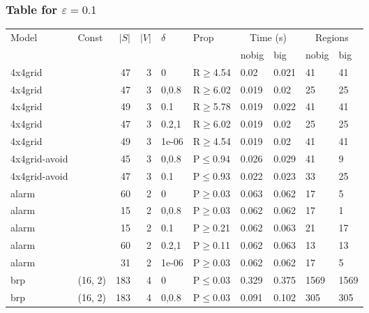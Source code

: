 \subsubsection{Table for \(\varepsilon=0.1\)}
\begin{longtable}{llrrllllll}

        \toprule
        Model & Const & $|S|$ & $|V|$ & $\delta$ & Prop & \multicolumn{2}{c}{Time (s)} & \multicolumn{2}{c}{Regions} \\
        \cmidrule(ll){7-8} \cmidrule(ll){9-10}
        & & & & & & nobig & big & nobig & big \\
        \midrule
        
 4x4grid       &          &     	47 &   3 & 0     & R$\geq$4.54  & 0.02   & 0.021   & 41      & 41   \\
 4x4grid       &          &     	47 &   3 & 0,0.8 & R$\geq$6.02  & 0.019  & 0.02    & 25      & 25   \\
 4x4grid       &          &     	49 &   3 & 0.1   & R$\geq$5.78  & 0.019  & 0.022   & 41      & 41   \\
 4x4grid       &          &     	47 &   3 & 0.2,1 & R$\geq$6.02  & 0.019  & 0.02    & 25      & 25   \\
 4x4grid       &          &     	49 &   3 & 1e-06 & R$\geq$4.54  & 0.019  & 0.02    & 41      & 41   \\
 4x4grid-avoid &          &     	45 &   3 & 0,0.8 & P$\leq$0.94  & 0.026  & 0.029   & 41      & 9    \\
 4x4grid-avoid &          &     	47 &   3 & 0.1   & P$\leq$0.93  & 0.022  & 0.023   & 33      & 25   \\
 alarm         &          &     	60 &   2 & 0     & P$\geq$0.03  & 0.063  & 0.062   & 17      & 5    \\
 alarm         &          &     	15 &   2 & 0,0.8 & P$\geq$0.03  & 0.062  & 0.062   & 17      & 1    \\
 alarm         &          &     	15 &   2 & 0.1   & P$\geq$0.21  & 0.062  & 0.063   & 21      & 17   \\
 alarm         &          &     	60 &   2 & 0.2,1 & P$\geq$0.11  & 0.062  & 0.063   & 13      & 13   \\
 alarm         &          &     	31 &   2 & 1e-06 & P$\geq$0.03  & 0.062  & 0.062   & 17      & 5    \\
 brp           & (16, 2)  &    	183 &   4 & 0     & P$\leq$0.03  & 0.329  & 0.375   & 1569    & 1569 \\
 brp           & (16, 2)  &    	183 &   4 & 0,0.8 & P$\leq$0.03  & 0.091  & 0.102   & 305     & 305  \\

\end{longtable}
